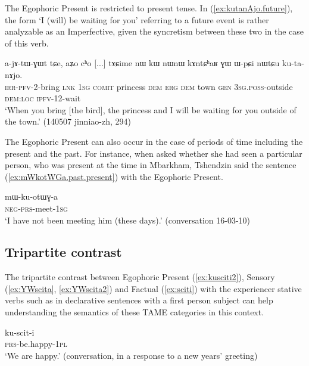 The Egophoric Present is restricted to present tense. In (\ref{ex:kutanAjo.future}), the form  `I (will) be waiting for you' referring to a future event is rather analyzable as an Imperfective, given the syncretism between these two in the case of this verb.

\begin{exe}
\ex \label{ex:kutanAjo.future}
\gll a-jɤ-tɯ-ɣɯt tɕe, aʑo cʰo [...] tɤɕime nɯ kɯ nɯnɯ kɤntɕʰaʁ ɣɯ ɯ-pɕi nɯtɕu ku-ta-nɤjo. \\
\textsc{irr}-\textsc{pfv}-2-bring \textsc{lnk} \textsc{1sg} \textsc{comit} { } princess \textsc{dem} \textsc{erg} \textsc{dem} town \textsc{gen} \textsc{3sg}.\textsc{poss}-outside \textsc{dem}:\textsc{loc} \textsc{ipfv}-1\fl{}2-wait \\
\glt `When you bring [the bird], the princess and I will be waiting for you outside of the town.' (140507 jinniao-zh, 294)
\end{exe}

The Egophoric Present can also occur in the case of periods of time including the present and the past. For instance, when asked whether she had seen a particular person, who was present at the time in Mbarkham, Tshendzin said the sentence (\ref{ex:mWkotWGa.past.present}) with the Egophoric Present.

\begin{exe}
\ex \label{ex:mWkotWGa.past.present}
\gll mɯ-ku-otɯɣ-a \\
\textsc{neg}-\textsc{prs}-meet-\textsc{1sg} \\
\glt `I have not been meeting him (these days).' (conversation 16-03-10)
\end{exe} 

 \subsection{Tripartite contrast} \label{sec:egophoric.tripartite}
The tripartite contrast between Egophoric Present (\ref{ex:kusciti2}), Sensory (\ref{ex:YWscita}, \ref{ex:YWscita2}) and Factual (\ref{ex:sciti}) with the experiencer stative verbs such as  in  declarative sentences with a first person subject can help understanding the semantics of these TAME categories in this context.


\begin{exe}
\ex \label{ex:kusciti2}
\gll ku-scit-i \\
\textsc{prs}-be.happy-\textsc{1pl} \\
\glt `We are happy.' (conversation, in a response to a new years' greeting)
\end{exe}

